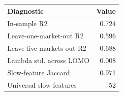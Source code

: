 \begin{tabular}{lr}
\toprule
Diagnostic & Value \\
\midrule
In-sample R2 & 0.724 \\
Leave-one-market-out R2 & 0.596 \\
Leave-five-markets-out R2 & 0.688 \\
Lambda std. across LOMO & 0.008 \\
Slow-feature Jaccard & 0.971 \\
Universal slow features & 52 \\
\bottomrule
\end{tabular}
